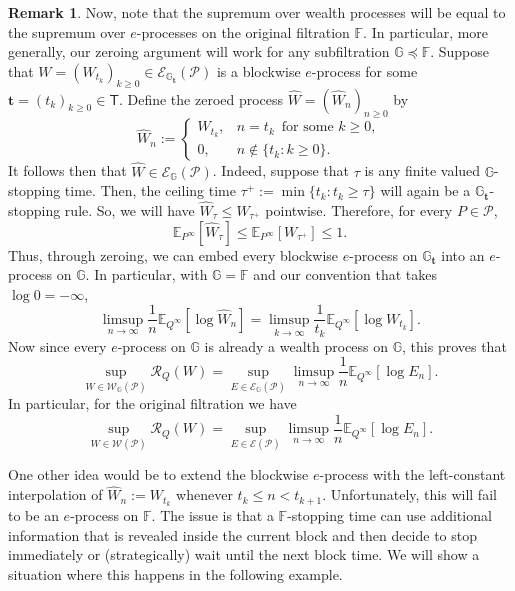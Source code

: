 \documentclass[11pt]{article}
\newcommand{\KLinf}{\mathrm{KL}_{\mathrm{inf}}}
\newcommand{\infKL}{\textnormal{inf-KL}}
\newcommand{\E}{\mathbb{E}}
\newcommand{\Pcal}{\mathcal{P}}
\newcommand{\bbF}{\mathbb F}
\newcommand{\bbG}{\mathbb G}
\newcommand{\bt}{\mathbf t}
\newcommand{\Tdet}{\mathsf T}
\newcommand{\Wcal}{\mathcal W}
\theoremstyle{definition}
\newtheorem{remark}[theorem]{Remark}
\theoremstyle{definition}
\begin{document}

\begin{remark}\label{rem:blockwise-versus-full-point-alternative}
Now, note that the supremum over wealth processes will be equal to the supremum over $e$-processes on the original filtration $\bbF$. In particular, more generally, our zeroing argument will work for any subfiltration $\bbG\preceq\bbF$. Suppose that $W=(W_{t_k})_{k\ge 0}\in\mathcal E_{\bbG_{\bt}}(\Pcal)$ is a blockwise $e$-process for some $\bt=(t_k)_{k\ge 0}\in\Tdet$. Define the zeroed process $\widehat W=(\widehat W_n)_{n\ge 0}$ by
\[
\widehat W_n:=
\begin{cases}
W_{t_k},&n=t_k\,\text{ for some $k\ge 0$},\\
0,&n\notin\{t_k:k\ge 0\}.
\end{cases}
\]
It follows then that $\widehat W\in\mathcal E_{\bbG}(\Pcal)$. Indeed, suppose that $\tau$ is any finite valued $\bbG$-stopping time. Then, the ceiling time $\tau^+:=\min\{t_k:t_k\ge \tau\}$ will again be a $\bbG_{\bt}$-stopping rule. So, we will have $\widehat W_{\tau}\le W_{\tau^+}$ pointwise. Therefore, for every $P\in\Pcal$,
\[
\E_{P^\infty}[\widehat W_\tau]\le \E_{P^\infty}[W_{\tau^+}]\le 1.
\]
Thus, through zeroing, we can embed every blockwise $e$-process on $\bbG_{\bt}$ into an $e$-process on $\bbG$. In particular, with $\bbG=\bbF$ and our convention that takes $\log 0 = -\infty$,
\[
\limsup_{n\to\infty}\frac{1}{n}\E_{Q^\infty}[\log \widehat W_n] = \limsup_{k\to\infty}\frac{1}{t_k}\E_{Q^\infty}[\log W_{t_k}].
\]
Now since every $e$-process on $\bbG$ is already a wealth process on $\bbG$, this proves that
\[
\sup_{W\in\Wcal_{\bbG}(\Pcal)}\mathcal R_Q(W) = \sup_{E\in\mathcal E_{\bbG}(\Pcal)} \limsup_{n\to\infty}\frac{1}{n}\E_{Q^\infty}[\log E_n].
\]
In particular, for the original filtration we have
\[
\boxed{
\sup_{W\in\Wcal(\Pcal)}\mathcal R_Q(W) = \sup_{E\in\mathcal E(\Pcal)} \limsup_{n\to\infty}\frac{1}{n}\E_{Q^\infty}[\log E_n].
}
\]
\end{remark}

One other idea would be to extend the blockwise $e$-process with the left-constant interpolation of $\widehat W_n:= W_{t_k}$ whenever $t_k\le n<t_{k+1}$. Unfortunately, this will fail to be an $e$-process on $\bbF$. The issue is that a $\bbF$-stopping time can use additional information that is revealed inside the current block and then decide to stop immediately or (strategically) wait until the next block time. We will show a situation where this happens in the following example.
\end{document}
